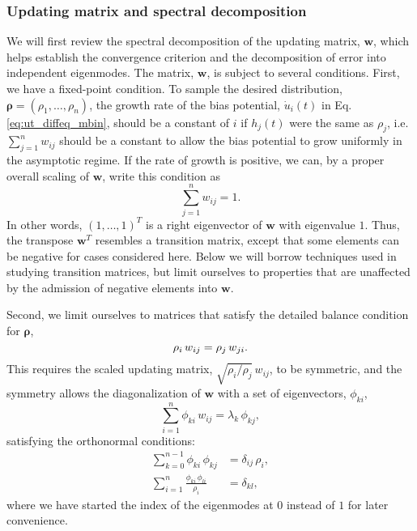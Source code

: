 \documentclass[reprint, superscriptaddress, floatfix]{revtex4-1}
\begin{document}
\subsubsection{\label{sec:updating-matrix}
Updating matrix and spectral decomposition}



We will first review the spectral decomposition
of the updating matrix, $\mathbf w$,
which helps establish the convergence criterion
and the decomposition of error into
independent eigenmodes.
%
The matrix, $\mathbf w$, is subject to several conditions.
%
First, we have a fixed-point condition\cite{bussi2006, dama2014}.
%
To sample the desired distribution,
$\pmb\rho = (\rho_1, \dots, \rho_n)$,
the growth rate of the bias potential,
${\dot u}_i(t)$
in Eq. \eqref{eq:ut_diffeq_mbin},
should be a constant of $i$
if $h_j(t)$ were the same as $\rho_j$,
i.e.
$\sum_{j=1}^n w_{ij}$ should be a constant
to allow the bias potential to grow uniformly
in the asymptotic regime.
%
If the rate of growth is positive,
we can, by a proper overall scaling of $\mathbf w$,
write this condition as
%
\begin{equation}
  \sum_{j = 1}^n w_{ij} = 1
  .
\label{eq:w_sumj}
\end{equation}
%
In other words, $(1, \dots, 1)^T$
is a right eigenvector of $\mathbf w$
with eigenvalue $1$.
%
Thus, the transpose $\mathbf w^T$
resembles a transition matrix,
except that some elements can be negative
for cases considered here.
%
Below we will %
borrow techniques used
in studying transition matrices\cite{vankampen},
but limit ourselves to properties that are unaffected
by the admission of negative elements into $\mathbf w$.


Second, we limit ourselves to matrices %
that satisfy
the detailed balance condition for $\pmb\rho$,
%
\begin{equation}
  \rho_i \, w_{ij} = \rho_j \, w_{ji}
  .
  \notag
\end{equation}
%
This requires the scaled updating matrix,
$\sqrt{ \rho_i/\rho_j } \, w_{ij}$,
to be symmetric,
and the symmetry allows the diagonalization
of $\mathbf w$ with a set of
eigenvectors, $\phi_{ki}$,
%
\begin{equation}
  \sum_{i = 1}^n \phi_{ki} \, w_{ij}
  =
  \lambda_k \, \phi_{kj}
  ,
\label{eq:eig_w}
\end{equation}
%
satisfying the orthonormal conditions\cite{vankampen}:
%
\begin{align}
  \sum_{k = 0}^{n - 1}
    \phi_{ki} \, \phi_{kj}
  &=
  \delta_{ij} \, \rho_i,
  \label{eq:eig_orthonormal_cols}
  \\
  \sum_{i = 1}^n
    \frac{ \phi_{ki} \, \phi_{li} }
         { \rho_i }
  &=
  \delta_{kl}
  ,
  \label{eq:eig_orthonormal_rows}
\end{align}
%
where we have started the index of the eigenmodes at $0$
instead of $1$ for later convenience.
\end{document}
